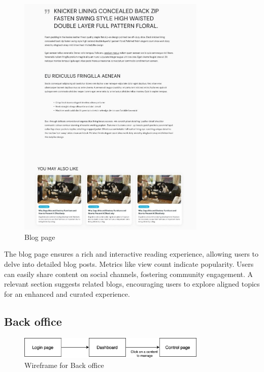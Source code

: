 \begin{figure}[H]
    \centering
    \includegraphics[width=0.8\textwidth]{Figures/blog_page_ui.jpg}
    \caption{Blog page}
\end{figure}

The blog page ensures a rich and interactive reading experience, allowing users to delve into detailed blog posts. Metrics like view count indicate popularity. Users can easily share content on social channels, fostering community engagement. A relevant section suggests related blogs, encouraging users to explore aligned topics for an enhanced and curated experience.

\subsection{Back office}

\begin{figure}[H]
    \centering
    \includegraphics[width=0.8\textwidth]{Figures/wireframe_bo.png}
    \caption{Wireframe for Back office}
\end{figure}

